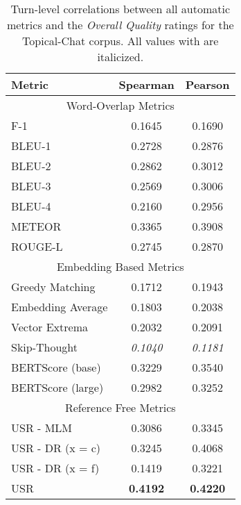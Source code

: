 \documentclass[11pt,a4paper]{article}
\begin{document}
\begin{table}
\centering
\begin{tabular}{|l|c|c|}
\hline
Metric                    & Spearman & Pearson  \\\hline
\multicolumn{3}{|c|}{Word-Overlap Metrics} \\ \hline
F-1                       & 0.1645   & 0.1690   \\
BLEU-1                    & 0.2728   & 0.2876   \\
BLEU-2                    & 0.2862   & 0.3012   \\
BLEU-3                    & 0.2569   & 0.3006   \\
BLEU-4                    & 0.2160   & 0.2956   \\
METEOR                    & 0.3365   & 0.3908   \\
ROUGE-L                   & 0.2745   & 0.2870   \\\hline
\multicolumn{3}{|c|}{Embedding Based Metrics} \\ \hline
Greedy Matching           & 0.1712   & 0.1943   \\
Embedding Average         & 0.1803   & 0.2038   \\
Vector Extrema            & 0.2032   & 0.2091   \\
Skip-Thought              & \textit{0.1040} & \textit{0.1181} \\
BERTScore (base)  & 0.3229   & 0.3540   \\
BERTScore (large) & 0.2982   & 0.3252   \\ \hline
\multicolumn{3}{|c|}{Reference Free Metrics} \\ \hline
USR - MLM               & 0.3086   & 0.3345   \\
USR - DR (x = c)   & 0.3245   & 0.4068   \\
USR - DR (x = f)   & 0.1419   & 0.3221   \\
USR             & \textbf{0.4192 }  & \textbf{0.4220 } \\\hline
\end{tabular}
\caption{Turn-level correlations between all automatic metrics and the \textit{Overall Quality} ratings for the Topical-Chat corpus. All values with  are italicized.}
\label{tab:turn_overall}
\end{table}
\end{document}
